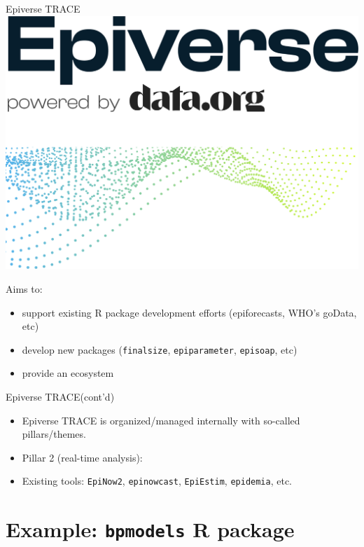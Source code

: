 \documentclass[10pt]{beamer}
\begin{document}
\begin{frame}[fragile]{Epiverse TRACE}
\includegraphics[scale=0.25]{../figures/Epiverse-RGB.png}

Aims to:

\begin{itemize}
\item support existing R package development efforts (epiforecasts, WHO's goData, etc)
\item develop new packages (\texttt{finalsize}, \texttt{epiparameter}, \texttt{episoap}, etc)
\item provide an ecosystem 
\end{itemize} 
\end{frame}

\begin{frame}[fragile]{Epiverse TRACE(cont'd)}
\begin{itemize}
	\item Epiverse TRACE is organized/managed internally with so-called pillars/themes.
	\item Pillar 2 (real-time analysis):
	\item Existing tools: \texttt{EpiNow2}, \texttt{epinowcast}, \texttt{EpiEstim}, \texttt{epidemia}, etc.
\end{itemize}
\end{frame}


\section{Example: \texttt{bpmodels} R package}
\end{document}
